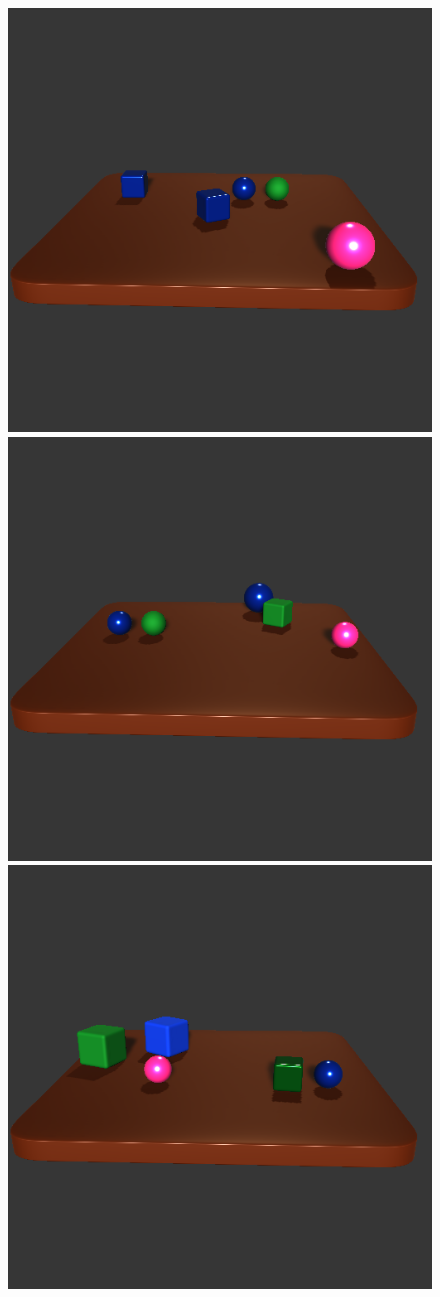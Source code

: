 \documentclass[
]{ceurart}
\begin{document}
\begin{figure}[h]
	\centering
	\begin{minipage}{0.4\textwidth}
		\centering
		\includegraphics[width=0.3\linewidth]{img/intro_hide/true1.png} 
		\includegraphics[width=0.3\linewidth]{img/intro_hide/true2.png} 
		\includegraphics[width=0.3\linewidth]{img/intro_hide/true3.png} 
		

\end{minipage}
\end{figure}
\end{document}
